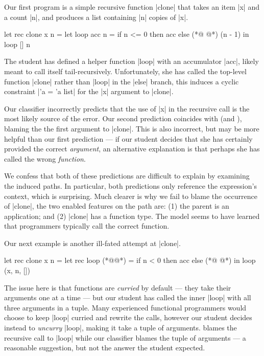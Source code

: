 Our first program is a simple recursive function |clone| that takes an
item |x| and a count |n|, and produces a list containing |n| copies of
|x|.
%
\begin{ecode}
  let rec clone x n =
    let loop acc n =
      if n <= 0 then
        acc
      else
        (*@ @*) (n - 1) in
    loop [] n
\end{ecode}
%
The student has defined a helper function |loop| with an accumulator
|acc|, likely meant to call itself tail-recursively.
%
Unfortunately, she has called the top-level function |clone| rather than
|loop| in the |else| branch, this induces a cyclic constraint |'a = 'a list|
for the |x| argument to |clone|.

Our classifier incorrectly predicts that the use of |x| in the recursive
call is the most likely source of the error.
%
Our second prediction coincides with \sherrloc (and \ocaml), blaming the
the first argument to |clone|.
%
This is also incorrect, but may be more helpful than our first
prediction --- if our student decides that she has certainly provided
the correct \emph{argument}, an alternative explanation is that
perhaps she has called the wrong \emph{function}.

We confess that both of these predictions are difficult to explain by
examining the induced paths.
%
In particular, both predictions only reference the expression's context,
which is surprising.
%
Much clearer is why we fail to blame the occurrence of |clone|, the two
enabled features on the path are:
%
(1) the parent is an application; and
%
(2) |clone| has a function type.
%
The model seems to have learned that programmers typically call the
correct function.

Our next example is another ill-fated attempt at |clone|.
%
\begin{ecode}
  let rec clone x n =
    let rec loop (*@@*) =
      if n < 0 then
        acc
      else
        (*@ @*) in
    loop (x, n, [])
\end{ecode}
%
The issue here is that \ocaml functions are \emph{curried} by default
--- \ie they take their arguments one at a time --- but our student has
called the inner |loop| with all three arguments in a tuple.
%
Many experienced functional programmers would choose to keep |loop|
curried and rewrite the calls, however our student decides instead to
\emph{uncurry} |loop|, making it take a tuple of arguments.
%
\sherrloc blames the recursive call to |loop| while our classifier
blames the tuple of arguments --- a reasonable suggestion, but not
the answer the student expected.

